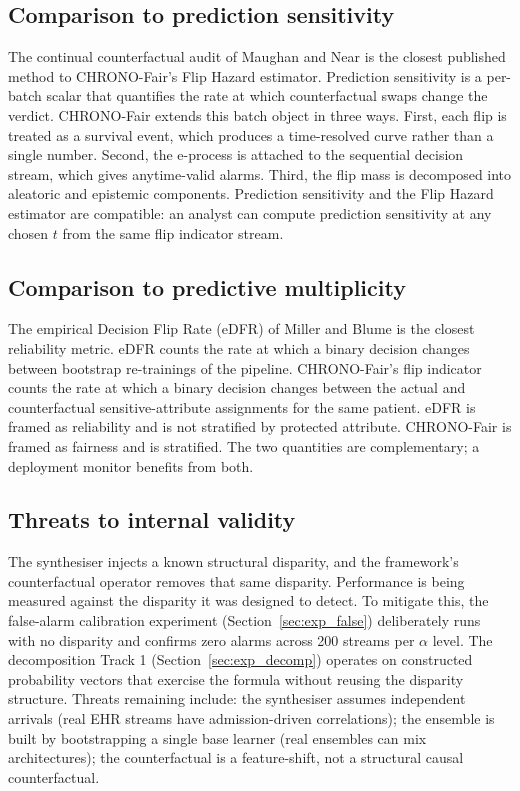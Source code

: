 \documentclass[acmsmall,nonacm,review,anonymous]{acmart}
\newcommand{\1}[1]{\mathbf{1}\!\left\{#1\right\}}
\begin{document}
\subsection{Comparison to prediction sensitivity}

The continual counterfactual audit of Maughan and Near \cite{maughan2022} is the closest published method to CHRONO-Fair's Flip Hazard estimator. Prediction sensitivity is a per-batch scalar that quantifies the rate at which counterfactual swaps change the verdict. CHRONO-Fair extends this batch object in three ways. First, each flip is treated as a survival event, which produces a time-resolved curve rather than a single number. Second, the e-process is attached to the sequential decision stream, which gives anytime-valid alarms. Third, the flip mass is decomposed into aleatoric and epistemic components. Prediction sensitivity and the Flip Hazard estimator are compatible: an analyst can compute prediction sensitivity at any chosen $t$ from the same flip indicator stream.

\subsection{Comparison to predictive multiplicity}

The empirical Decision Flip Rate (eDFR) of Miller and Blume \cite{miller2024edfr} is the closest reliability metric. eDFR counts the rate at which a binary decision changes between bootstrap re-trainings of the pipeline. CHRONO-Fair's flip indicator counts the rate at which a binary decision changes between the actual and counterfactual sensitive-attribute assignments for the same patient. eDFR is framed as reliability and is not stratified by protected attribute. CHRONO-Fair is framed as fairness and is stratified. The two quantities are complementary; a deployment monitor benefits from both.

\subsection{Threats to internal validity}

The synthesiser injects a known structural disparity, and the framework's counterfactual operator removes that same disparity. Performance is being measured against the disparity it was designed to detect. To mitigate this, the false-alarm calibration experiment (Section~\ref{sec:exp_false}) deliberately runs with no disparity and confirms zero alarms across 200 streams per $\alpha$ level. The decomposition Track 1 (Section~\ref{sec:exp_decomp}) operates on constructed probability vectors that exercise the formula without reusing the disparity structure. Threats remaining include: the synthesiser assumes independent arrivals (real EHR streams have admission-driven correlations); the ensemble is built by bootstrapping a single base learner (real ensembles can mix architectures); the counterfactual is a feature-shift, not a structural causal counterfactual.
\end{document}
